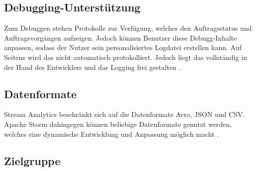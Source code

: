 \subsection{Debugging-Unterstützung} 
Zum Debuggen stehen Protokolle zur Verfügung, welches den Auftragsstatus und Auftragsvorgängen aufzeigen. Jedoch können Benutzer diese Debugg-Inhalte anpassen, sodass der Nutzer sein personalisiertes Logdatei erstellen kann. Auf Seitens wird das nicht automatisch protokolliert. Jedoch liegt das vollständig in der Hand des Entwicklers und das Logging frei gestalten \cite{apachedebugging.2106}.


\subsection{Datenformate}
Stream Analytics beschränkt sich auf die Datenformate Avro, JSON und CSV. Apache Storm dahingegen können beliebige Datenformate genutzt werden, welches eine dynamische Entwicklung und Anpassung möglich macht \cite{Klein.2017}. 

\subsection{Zielgruppe}

